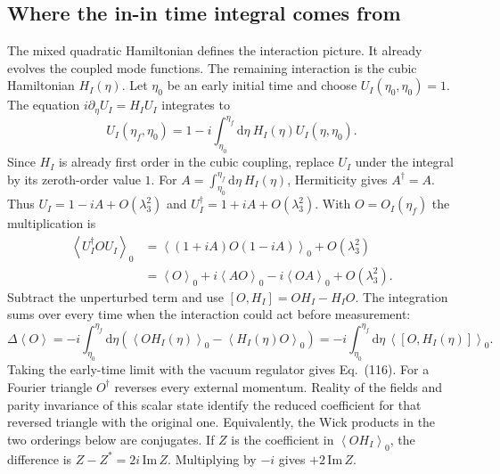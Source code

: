 \documentclass[11pt,a4paper]{article}
\newcommand{\dd}{\mathrm d}
\newcommand{\avg}[1]{\left\langle #1\right\rangle}
\begin{document}
\clearpage
\subsection{Where the in-in time integral comes from}
The mixed quadratic Hamiltonian defines the interaction picture. It already evolves the coupled mode functions. The remaining interaction is the cubic Hamiltonian $H_I(\eta)$. Let $\eta_0$ be an early initial time and choose $U_I(\eta_0,\eta_0)=1$. The equation $i\partial_{\eta}U_I=H_I U_I$ integrates to
\begin{equation}
 U_I(\eta_f,\eta_0)=1-i\int_{\eta_0}^{\eta_f}\dd\eta\ H_I(\eta)U_I(\eta,\eta_0).
\end{equation}
Since $H_I$ is already first order in the cubic coupling, replace $U_I$ under the integral by its zeroth-order value $1$. For $A=\int_{\eta_0}^{\eta_f}\dd\eta\ H_I(\eta)$, Hermiticity gives $A^\dagger=A$. Thus $U_I=1-iA+O(\lambda_3^2)$ and $U_I^\dagger=1+iA+O(\lambda_3^2)$. With $O=O_I(\eta_f)$ the multiplication is
\begin{align}
\avg{U_I^\dagger O U_I}_0
 &=\avg{(1+iA)O(1-iA)}_0+O(\lambda_3^2)\nonumber\\
 &=\avg O_0+i\avg{AO}_0-i\avg{OA}_0+O(\lambda_3^2).
\end{align}
Subtract the unperturbed term and use $[O,H_I]=OH_I-H_IO$. The integration sums over every time when the interaction could act before measurement:
\begin{equation}\boxed{\displaystyle
\Delta\avg O=-i\int_{\eta_0}^{\eta_f}\dd\eta\left(\avg{O H_I(\eta)}_0-\avg{H_I(\eta)O}_0\right)
=-i\int_{\eta_0}^{\eta_f}\dd\eta\,\avg{[O,H_I(\eta)]}_0 .}
\end{equation}
Taking the early-time limit with the vacuum regulator gives Eq.~(116). For a Fourier triangle $O^\dagger$ reverses every external momentum. Reality of the fields and parity invariance of this scalar state identify the reduced coefficient for that reversed triangle with the original one. Equivalently, the Wick products in the two orderings below are conjugates. If $Z$ is the coefficient in $\avg{O H_I}_0$, the difference is $Z-Z^*=2i\,\mathrm{Im}\,Z$. Multiplying by $-i$ gives $+2\,\mathrm{Im}\,Z$.
\end{document}

